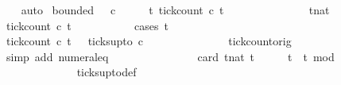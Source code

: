 \begin{isabellebody}
%
\isadelimproof
\ \ %
\endisadelimproof
%
\isatagproof
{}\isamarkupfalse%
\ auto%
\endisatagproof
{\isafoldproof}%
%
\isadelimproof
\isanewline
%
\endisadelimproof
\isanewline
{}\isamarkupfalse%
\ {\isacartoucheopen}bounded\ {}\ {}\ c{}{\isacartoucheclose}\isanewline
%
\isadelimproof
%
\endisadelimproof
%
\isatagproof
{}\isamarkupfalse%
\ {\isacharminus}\isanewline
\ \ \isamarkupfalse%
\ {\isacartoucheopen}{\isasymforall}t{\isachardot}\ tick{\isacharunderscore}count\ c{}\ t\ {}\ {\isasymle}\ {}{\isacartoucheclose}\isanewline
\ \ \isamarkupfalse%
\ {\isacharminus}\isanewline
\ \ \ \ \isacommand{{\isacharbraceleft}}\isamarkupfalse%
\ \isamarkupfalse%
\ tnat\isanewline
\ \ \ \ \ \ \isamarkupfalse%
\ {\isacartoucheopen}tick{\isacharunderscore}count\ c{}\ t\ {}\ {\isasymle}\ {}{\isacartoucheclose}\isanewline
\ \ \ \ \ \ \isamarkupfalse%
\ {\isacharparenleft}cases\ t\isanewline
\ \ \ \ \ \ \ \ \isamarkupfalse%
\ {}\isanewline
\ \ \ \ \ \ \ \ \ \ \isamarkupfalse%
\ {\isacartoucheopen}tick{\isacharunderscore}count\ c{}\ t\ {}\ {\isacharequal}\ ticks{\isacharunderscore}up{\isacharunderscore}to\ c{}\ {}{\isacartoucheclose}\isanewline
\ \ \ \ \ \ \ \ \ \ \ \ \isamarkupfalse%
\ tick{\isacharunderscore}count{\isacharunderscore}orig\ \isamarkupfalse%
\ {\isacharparenleft}simp\ add{\isacharcolon}\ numeral{\isacharunderscore}{}{\isacharunderscore}eq{\isacharunderscore}{}{\isacharparenright}\isanewline
\ \ \ \ \ \ \ \ \ \ \isamarkupfalse%
\ \isamarkupfalse%
\ {\isacartoucheopen}{\isachardot}{\isachardot}{\isachardot}\ {\isacharequal}\ card\ {\isacharbraceleft}t{\isacharcolon}{\isacharcolon}nat{\isachardot}\ t\ {\isasymle}\ {}\ {\isasymand}\ {}\ {\isasymle}\ t\ {\isasymand}\ {\isacharparenleft}t{\isacharminus}{}{\isacharparenright}\ mod\ {}\ {\isacharequal}\ {}{\isacharbraceright}{\isacartoucheclose}\isanewline
\ \ \ \ \ \ \ \ \ \ \ \ \isamarkupfalse%
\ ticks{\isacharunderscore}up{\isacharunderscore}to{\isacharunderscore}def\ \isamarkupfalse%

\end{isabellebody}
